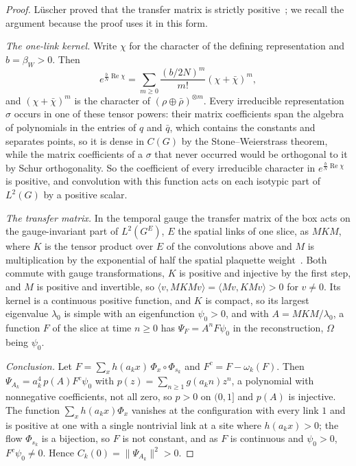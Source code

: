 \documentclass[aps,prd,twocolumn,superscriptaddress,nofootinbib,longbibliography,floatfix,amsmath,amssymb,10pt]{revtex4-2}
\theoremstyle{definition}
\theoremstyle{remark}
\newcommand{\ip}[2]{\langle #1,#2\rangle}
\begin{document}
\begin{proof}
L\"uscher proved that the transfer matrix is strictly positive~\cite{Lus77};
we recall the argument because the proof uses it in this form.

\emph{The one-link kernel.} Write $\chi$ for the character of the defining
representation and $b=\beta_W>0$. Then
\[
e^{\frac bN\operatorname{Re}\chi}=\sum_{m\ge0}\frac{(b/2N)^m}{m!}
(\chi+\bar\chi)^m ,
\]
and $(\chi+\bar\chi)^m$ is the character of $(\rho\oplus\bar\rho)^{\otimes m}$.
Every irreducible representation $\sigma$ occurs in one of these tensor
powers: their matrix coefficients span the algebra of polynomials in the
entries of $q$ and $\bar q$, which contains the constants and separates points,
so it is dense in $C(G)$ by the Stone--Weierstrass theorem, while the matrix
coefficients of a $\sigma$ that never occurred would be orthogonal to it by
Schur orthogonality. So the coefficient of every irreducible character in
$e^{\frac bN\operatorname{Re}\chi}$ is positive, and convolution with this
function acts on each isotypic part of $L^2(G)$ by a positive scalar.

\emph{The transfer matrix.} In the temporal gauge the transfer matrix of the
box acts on the gauge-invariant part of $L^2(G^{E})$, $E$ the spatial links
of one slice, as $M K M$, where $K$ is the tensor product over $E$ of the
convolutions above and $M$ is multiplication by the exponential of half the
spatial plaquette weight~\cite{Lus77,OSei78}. Both commute with gauge
transformations, $K$ is positive and injective by the first step, and $M$ is
positive and invertible, so $\ip v{MKMv}=\ip{Mv}{KMv}>0$ for $v\ne0$. Its
kernel is a continuous positive function, and $K$ is compact, so its largest eigenvalue $\lambda_0$ is
simple with an eigenfunction $\psi_0>0$, and with $A=MKM/\lambda_0$, a
function $F$ of the slice at time $n\ge0$ has $\Psi_F=A^nF\psi_0$ in the
reconstruction, $\Omega$ being $\psi_0$.

\emph{Conclusion.} Let $F=\sum_xh(a_kx)\,\Phi_x\circ\Phi_{s_k}$ and
$F^c=F-\omega_k(F)$. Then $\Psi_{A_k}=a_k^4\,p(A)F^c\psi_0$ with
$p(z)=\sum_{n\ge1}g(a_kn)z^n$, a polynomial with nonnegative coefficients,
not all zero, so $p>0$ on $(0,1]$ and $p(A)$ is injective. The function
$\sum_xh(a_kx)\Phi_x$ vanishes at the configuration with every link $1$ and is
positive at one with a single nontrivial link at a site where $h(a_kx)>0$; the
flow $\Phi_{s_k}$ is a bijection, so $F$ is not constant, and as $F$ is
continuous and $\psi_0>0$, $F^c\psi_0\ne0$. Hence $C_k(0)=\|\Psi_{A_k}\|^2>0$.
\end{proof}
\end{document}
